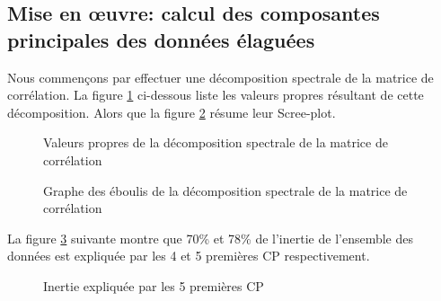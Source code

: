 	\subsection{Mise en œuvre: calcul des composantes principales des données élaguées}
	Nous commençons par effectuer une décomposition spectrale de la matrice de corrélation. La figure \ref{fig:valpropres} ci-dessous liste les valeurs propres résultant de cette décomposition. Alors que la figure \ref{fig:scree} résume leur Scree-plot.
				\begin{figure}[H]
					    		\centering
					    		\caption{Valeurs propres de la décomposition spectrale de la matrice de corrélation}
					    		\label{fig:valpropres}
				\end{figure}
					\begin{figure}[H]
						    		\centering
						    		\caption{Graphe des éboulis de la décomposition spectrale de la matrice de corrélation}
						    		\label{fig:scree}
					\end{figure}
	La figure \ref{fig:inert} suivante montre que 70\% et 78\% de l'inertie de l'ensemble des données est expliquée par les 4 et 5 premières CP respectivement.
				\begin{figure}[H]
					    		\centering
					    		\caption{Inertie expliquée par les 5 premières CP}
					    		\label{fig:inert}
				\end{figure}
